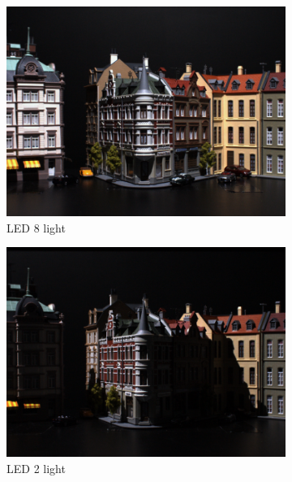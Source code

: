 \documentclass[thesis.tex]{subfiles}
\begin{document}
\begin{figure}[tb]
	\centering
	\begin{subfigure}[t]{0.32\textwidth}
		\includegraphics[width=\textwidth]{img/scene_04_img60_08.png}
		\caption{LED 8 light}
		\label{fig:light_example_08}
	\end{subfigure}
	\begin{subfigure}[t]{0.32\textwidth}
		\includegraphics[width=\textwidth]{img/scene_04_img60_02.png}
		\caption{LED 2 light}
		\label{fig:light_example_02}
	\end{subfigure}
	\begin{subfigure}[t]{0.32\textwidth}

\end{subfigure}
\end{figure}
\end{document}
